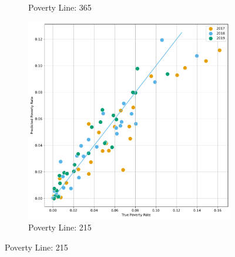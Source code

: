 \begin{figure}[H]
\begin{subfigure}[b]{0.47\textwidth}
             \caption{Poverty Line: 365}
         \end{subfigure} 
          \hfill
         \begin{subfigure}[b]{0.47\textwidth}
             \centering
             \includegraphics[width=\textwidth]{../figures/fig4_2_prediction_vs_true_poverty_rate_regions_p215_scatter.pdf}
             \caption{Poverty Line: 215}
         \end{subfigure} 
\end{figure}



